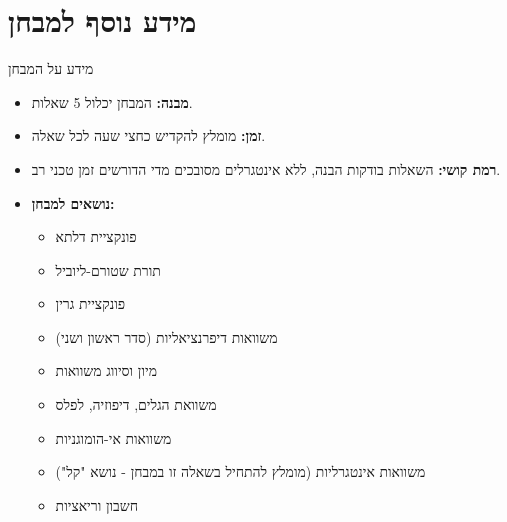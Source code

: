 \newpage

\section*{מידע נוסף למבחן}

\begin{summarybox}{מידע על המבחן}
    \begin{itemize}
        \item \textbf{מבנה:} המבחן יכלול 5 שאלות.
        \item \textbf{זמן:} מומלץ להקדיש כחצי שעה לכל שאלה.
        \item \textbf{רמת קושי:} השאלות בודקות הבנה, ללא אינטגרלים מסובכים מדי הדורשים זמן טכני רב.
        \item \textbf{נושאים למבחן:}
        \begin{itemize}
            \item פונקציית דלתא
            \item תורת שטורם-ליוביל
            \item פונקציית גרין
            \item משוואות דיפרנציאליות (סדר ראשון ושני)
            \item מיון וסיווג משוואות
            \item משוואת הגלים, דיפוזיה, לפלס
            \item משוואות אי-הומוגניות
            \item משוואות אינטגרליות (מומלץ להתחיל בשאלה זו במבחן - נושא "קל")
            \item חשבון וריאציות
        \end{itemize}
    \end{itemize}
\end{summarybox}


